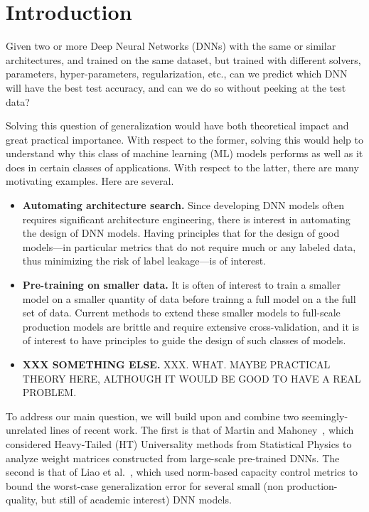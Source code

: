 
\section{Introduction}
\label{sxn:intro}

Given two or more Deep Neural Networks (DNNs) with the same or similar architectures, and trained on the same dataset, but trained with different solvers, parameters, hyper-parameters, regularization, etc., can we predict which DNN will have the best test accuracy, and can we do so without peeking at the test data?   

Solving this question of generalization would have both theoretical impact and great practical importance. 
With respect to the former, solving this would help to understand why this class of machine learning (ML) models performs as well as it does in certain classes of applications.
With respect to the latter, there are many motivating examples.
% 
Here are several.
\begin{itemize}
\item
\textbf{Automating architecture search.}
Since developing DNN models often requires significant architecture engineering, there is interest in automating the design of DNN models.
Having principles that for the design of good models---in particular metrics that do not require much or any labeled data, thus minimizing the risk of label leakage---is of interest.
\item
\textbf{Pre-training on smaller data.}
It is often of interest to train a smaller model on a smaller quantity of data before trainng a full model on a the full set of data.
Current methods to extend these smaller models to full-scale production models are brittle and require extensive cross-validation, and it is of interest to have principles to guide the design of such classes of models.
\item
\textbf{XXX SOMETHING ELSE.}
XXX.  WHAT.  MAYBE PRACTICAL THEORY HERE, ALTHOUGH IT WOULD BE GOOD TO HAVE A REAL PROBLEM.
\end{itemize}

To address our main question, we will build upon and combine two seemingly-unrelated lines of recent work.
The first is that of Martin and Mahoney~\cite{MM17_TR,MM18_TR}, which considered Heavy-Tailed (HT) Universality methods from Statistical Physics to analyze weight matrices constructed from large-scale pre-trained DNNs.
The second is that of Liao et al.~\cite{LMBx18_TR}, which used norm-based capacity control metrics to bound the worst-case generalization error for several small (non production-quality, but still of academic interest) DNN models.

